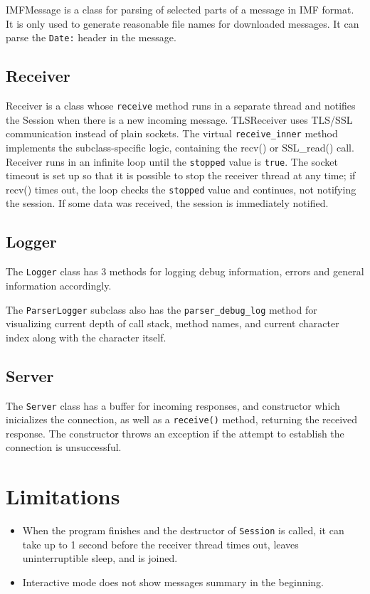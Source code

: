 \documentclass[a4]{report}
\begin{document}
IMFMessage is a class for parsing of selected parts of a message in IMF format\cite{rfc5322}. It is only used to generate reasonable file names for downloaded messages. It can parse the \texttt{Date:} header in the message.

\subsection{Receiver}

Receiver is a class whose \texttt{receive} method runs in a separate thread and notifies the Session when there is a new incoming message. TLSReceiver uses TLS/SSL communication instead of plain sockets. The virtual \texttt{receive\_inner} method implements the subclass-specific logic, containing the recv() or SSL\_read() call. Receiver runs in an infinite loop until the \texttt{stopped} value is \texttt{true}. The socket timeout is set up so that it is possible to stop the receiver thread at any time; if recv() times out, the loop checks the \texttt{stopped} value and continues, not notifying the session. If some data was received, the session is immediately notified.

\subsection{Logger}

The \texttt{Logger} class has 3 methods for logging debug information, errors and general information accordingly.

The \texttt{ParserLogger} subclass also has the \texttt{parser\_debug\_log} method for visualizing current depth of call stack, method names, and current character index along with the character itself.

\subsection{Server}

The \texttt{Server} class has a buffer for incoming responses, and constructor which inicializes the connection, as well as a \texttt{receive()} method, returning the received response. The constructor throws an exception if the attempt to establish the connection is unsuccessful.

\section{Limitations}

\begin{itemize}
  \item When the program finishes and the destructor of \texttt{Session} is called, it can take up to 1 second before the receiver thread times out, leaves uninterruptible sleep, and is joined.
  \item Interactive mode does not show messages summary in the beginning.

\end{itemize}
\end{document}
